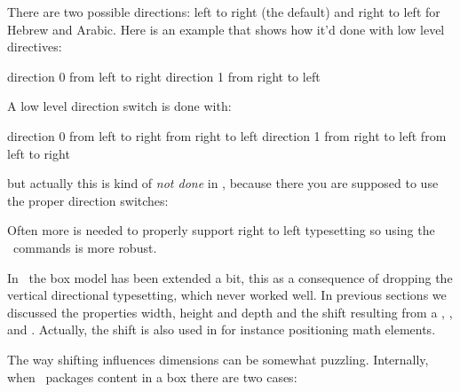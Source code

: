 \stopsectionlevel

\startsectionlevel[title={\LUAMETATEX\ primitives}]

There are two possible directions: left to right (the default) and right to left
for Hebrew and Arabic. Here is an example that shows how it'd done with low level
directives:

\startbuffer
\hbox direction 0 {from left to right}
\hbox direction 1 {from right to left}
\stopbuffer

\typebuffer[option=TEX]

\startlinecorrection
\getbuffer
\stoplinecorrection

A low level direction switch is done with:

\startbuffer
\hbox direction 0
    {from left to right  from right to left}
\hbox direction 1
    {from right to left  from left to right}
\stopbuffer

\typebuffer[option=TEX]

\startlinecorrection
\getbuffer
\stoplinecorrection

but actually this is kind of {\em not done} in \CONTEXT, because there you are
supposed to use the proper direction switches:

\startbuffer
{}
\stopbuffer

\typebuffer[option=TEX]

\startlinecorrection
\getbuffer
\stoplinecorrection

Often more is needed to properly support right to left typesetting so using the
\CONTEXT\ commands is more robust.

In \LUAMETATEX\ the box model has been extended a bit, this as a consequence of
dropping the vertical directional typesetting, which never worked well. In
previous sections we discussed the properties width, height and depth and the
shift resulting from a \type {\raise}, \type {\lower}, \type {\moveleft} and
\type {\moveright}. Actually, the shift is also used in for instance positioning
math elements.

The way shifting influences dimensions can be somewhat puzzling. Internally, when
\TEX\ packages content in a box there are two cases:


